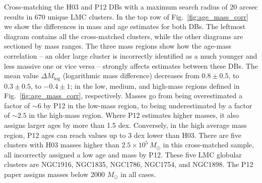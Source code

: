 \documentclass[draft]{aa}
\begin{document}
Cross-matching the H03 and P12 DBs with a maximum search radius of 20
arcsec results in 670 unique LMC clusters.
In the top row of Fig.~\ref{fig:age_mass_corr} we show the differences
in mass and age estimates for both DBs. The leftmost diagram contains all the
cross-matched clusters, while the other diagrams are sectioned by mass
ranges. The three mass regions show how the age-mass correlation -- an older
large cluster is incorrectly identified as a much younger and less massive one
or vice versa -- strongly affects estimates between these DBs.\@
%
The mean value $\overline{\Delta M_{\log}}$ (logarithmic mass difference)
decreases from $0.8{\pm}0.5$, to $0.3{\pm}0.5$, to $-0.4{\pm}1$; in the
low, medium, and high-mass regions defined in Fig.~\ref{fig:age_mass_corr},
respectively. Masses go from being overestimated a
factor of ${\sim}6$ by P12 in the low-mass region, to being underestimated by a
factor of ${\sim}2.5$ in the high-mass region.
%
Where P12 estimates higher masses, it also assigns larger ages by more than 1.5
dex. Conversely, in the high average mass region, P12 ages can reach
values up to 3 dex lower than H03.
%
There are five clusters with H03 masses higher than
$2.5{\times}10^5\,M_{\odot}$ in this cross-matched sample, all incorrectly
assigned a low age and mass by P12. These five LMC globular clusters
are NGC1916, NGC1835, NGC1786, NGC1754, and NGC1898. The P12 paper assigns masses below
2000 $M_{\odot}$ in all cases.
%
\end{document}
